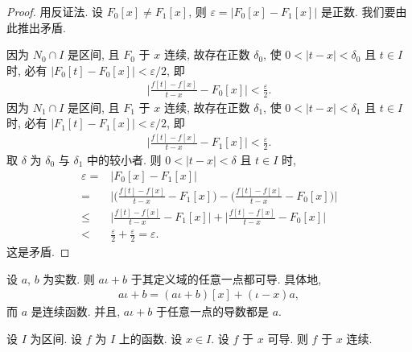 \begin{proof}
    用反证法.
    设 $F_0 [x] \neq F_1 [x]$,
    则 $\varepsilon = |F_0 [x] - F_1 [x]|$ 是正数.
    我们要由此推出矛盾.

    因为 $N_0 \cap I$ 是区间, 且 $F_0$ 于 $x$ 连续,
    故存在正数 $\delta_0$,
    使 $0 < |t - x| < \delta_0$ 且 $t \in I$ 时,
    必有 $|F_0 [t] - F_0 [x]| < {\varepsilon}/{2}$,
    即
    \begin{align*}
        \Bigg| \frac{f[t] - f[x]}{t - x} - F_0 [x] \Bigg| < \frac{\varepsilon}{2}.
    \end{align*}
    因为 $N_1 \cap I$ 是区间,
    且 $F_1$ 于 $x$ 连续,
    故存在正数 $\delta_1$,
    使 $0 < |t - x| < \delta_1$ 且 $t \in I$ 时,
    必有 $|F_1 [t] - F_1 [x]| < {\varepsilon}/{2}$,
    即
    \begin{align*}
        \Bigg| \frac{f[t] - f[x]}{t - x} - F_1 [x] \Bigg| < \frac{\varepsilon}{2}.
    \end{align*}
    取 $\delta$ 为 $\delta_0$ 与 $\delta_1$ 中的较小者.
    则 $0 < |t - x| < \delta$ 且 $t \in I$ 时,
    \begin{align*}
        \varepsilon
        = {}    & |F_0 [x] - F_1 [x]|                                                                                                 \\
        = {}    & \Bigg| \Bigg( \frac{f[t] - f[x]}{t - x} - F_1 [x] \Bigg) - \Bigg( \frac{f[t] - f[x]}{t - x} - F_0 [x] \Bigg) \Bigg| \\
        \leq {} & \Bigg| \frac{f[t] - f[x]}{t - x} - F_1 [x] \Bigg| + \Bigg| \frac{f[t] - f[x]}{t - x} - F_0 [x] \Bigg|               \\
        < {}    & \frac{\varepsilon}{2} + \frac{\varepsilon}{2} = \varepsilon.
    \end{align*}
    这是矛盾.
\end{proof}

\begin{example}
    设 $a$, $b$ 为实数.
    则 $a\iota + b$ 于其定义域的任意一点都可导.
    具体地,
    \begin{align*}
        a\iota + b = (a\iota + b)[x] + (\iota - x)a,
    \end{align*}
    而 $a$ 是连续函数.
    并且, $a\iota + b$ 于任意一点的导数都是 $a$.
\end{example}

\begin{theorem}
    设 $I$ 为区间.
    设 $f$ 为 $I$ 上的函数.
    设 $x \in I$.
    设 $f$ 于 $x$ 可导.
    则 $f$ 于 $x$ 连续.
\end{theorem}

